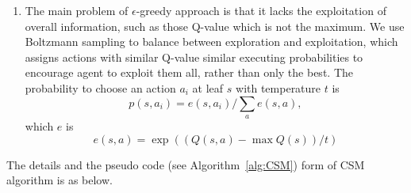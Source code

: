 \documentclass[conference]{IEEEtran}
\begin{document}
\begin{enumerate}
		\item The main problem of $\epsilon$-greedy approach is that it lacks the exploitation of overall information,
		such as those Q-value which is not the maximum. We use Boltzmann sampling to balance between
		exploration and exploitation, which assigns actions with similar Q-value similar executing
		probabilities to encourage agent to exploit them all, rather than only the best.
		The probability to choose an action $a_i$ at leaf $s$ with temperature $t$ is
		\begin{equation}
		p(s, a_i) = e(s, a_i)/ \sum_a{e(s, a)} \label{equ:boltzmann},
		\end{equation}  
		which $e$ is
		\begin{equation}
		e(s, a) = \exp( (Q(s, a) - \max Q(s))/t )
		\end{equation}
		
	\end{enumerate}
	
	The details and the pseudo code (see Algorithm~\ref{alg:CSM}) form of CSM algorithm is as below.
	
\end{document}
